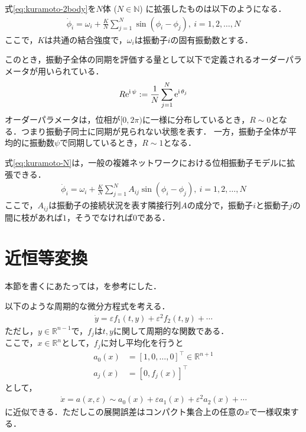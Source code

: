 \documentclass[../main]{subfiles}
\begin{document}
式\eqref{eq:kuramoto-2body}を$N$体 ($N\in\mathbb{N}$) に拡張したものは以下のようになる．
\begin{align}
    \label{eq:kuramoto-N}
    \dot{\phi}_i=\omega_i+\frac{K}{N}\sum_{j=1}^N\sin(\phi_i-\phi_j),\ i=1,2,\ldots,N
\end{align}
ここで，$K$は共通の結合強度で，$\omega_i$は振動子$i$の固有振動数とする．

このとき，振動子全体の同期を評価する量として以下で定義されるオーダーパラメータが用いられている．
\begin{align*}
    R\mathrm{e}^{{\mathrm i\,} \psi}:=\frac{1}{N}\sum_{j=1}^N\mathrm{e}^{{\mathrm i\,} \theta_j}    
\end{align*}
オーダーパラメータは，位相が$[0,2\pi)$に一様に分布しているとき，$R\sim 0$となる．つまり振動子同士に同期が見られない状態を表す．
一方，振動子全体が平均的に振動数$\psi$で同期しているとき，$R\sim 1$となる．

式\eqref{eq:kuramoto-N}は，一般の複雑ネットワークにおける位相振動子モデルに拡張できる．
\begin{align*}
    \dot{\phi}_i=\omega_i+\frac{K}{N}\sum_{j=1}^NA_{ij}\sin(\phi_i-\phi_j),\ i=1,2,\ldots,N
\end{align*}
ここで，$A_{ij}$は振動子の接続状況を表す隣接行列$A$の成分で，振動子$i$と振動子$j$の間に枝があれば$1$，そうでなければ$0$である．
\section{近恒等変換}
本節を書くにあたっては，\cite{james2003}を参考にした．

以下のような周期的な微分方程式を考える．
\begin{align*}
    \dot{y}=\varepsilon f_1(t,y)+\varepsilon^2f_2(t,y)+\cdots
\end{align*}
ただし，$y\in\mathbb{R}^{n-1}$で，$f_j$は$t,y$に関して周期的な関数である．\\
ここで，$x\in\mathbb{R}^{n}$として，$f_j$に対し平均化を行うと
\begin{align*}
    a_0(x)&=[1,0,\ldots,0]^\top\in\mathbb{R}^{n+1}\\
    a_j(x)&=[0,f_j(x)]^\top
\end{align*}
として，
\begin{align*}
    \dot{x}=a(x,\varepsilon)\sim a_0(x)+\varepsilon a_1(x)+\varepsilon^2 a_2(x)+\cdots
\end{align*}
に近似できる．ただしこの展開誤差はコンパクト集合上の任意の$x$で一様収束する．
\end{document}

